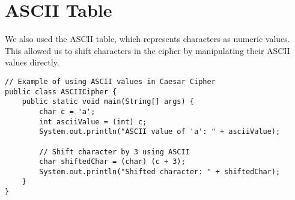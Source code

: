 \documentclass{article}
\begin{document}
\section{ASCII Table}
We also used the ASCII table, which represents characters as numeric values. This allowed us to shift characters in the cipher by manipulating their ASCII values directly.
\begin{lstlisting}
// Example of using ASCII values in Caesar Cipher
public class ASCIICipher {
    public static void main(String[] args) {
        char c = 'a';
        int asciiValue = (int) c;
        System.out.println("ASCII value of 'a': " + asciiValue);
        
        // Shift character by 3 using ASCII
        char shiftedChar = (char) (c + 3);
        System.out.println("Shifted character: " + shiftedChar);
    }
}
\end{lstlisting}
\end{document}
